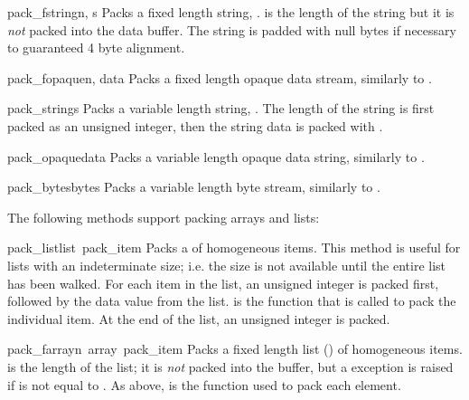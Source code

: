 \begin{funcdesc}{pack_fstring}{n, s}
Packs a fixed length string, .   is the length of the
string but it is \emph{not} packed into the data buffer.  The string
is padded with null bytes if necessary to guaranteed 4 byte alignment.
\end{funcdesc}

\begin{funcdesc}{pack_fopaque}{n, data}
Packs a fixed length opaque data stream, similarly to
.
\end{funcdesc}

\begin{funcdesc}{pack_string}{s}
Packs a variable length string, .  The length of the string is
first packed as an unsigned integer, then the string data is packed
with .
\end{funcdesc}

\begin{funcdesc}{pack_opaque}{data}
Packs a variable length opaque data string, similarly to
.
\end{funcdesc}

\begin{funcdesc}{pack_bytes}{bytes}
Packs a variable length byte stream, similarly to .
\end{funcdesc}

The following methods support packing arrays and lists:

\begin{funcdesc}{pack_list}{list\, pack_item}
Packs a  of homogeneous items.  This method is useful for
lists with an indeterminate size; i.e. the size is not available until
the entire list has been walked.  For each item in the list, an
unsigned integer  is packed first, followed by the data value
from the list.   is the function that is called to pack
the individual item.  At the end of the list, an unsigned integer
 is packed.
\end{funcdesc}

\begin{funcdesc}{pack_farray}{n\, array\, pack_item}
Packs a fixed length list () of homogeneous items.  
is the length of the list; it is \emph{not} packed into the buffer,
but a  exception is raised if  is not
equal to .  As above,  is the function used to
pack each element.
\end{funcdesc}

